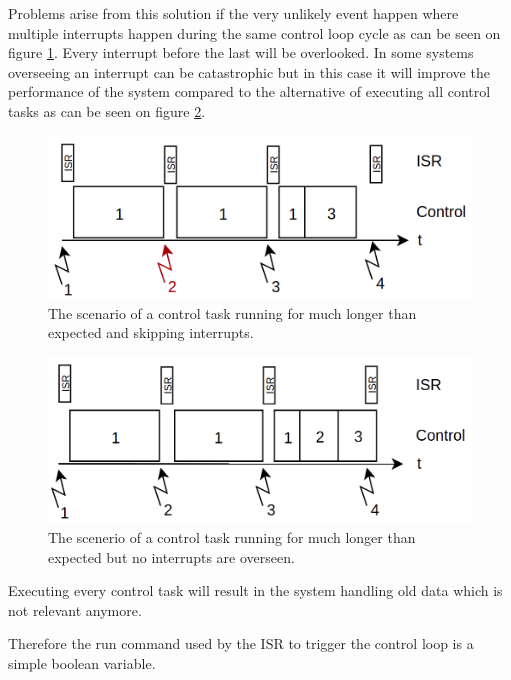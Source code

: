 Problems arise from this solution if the very unlikely event happen where multiple interrupts happen during the same control loop cycle as can be seen on figure \ref{fig:isr4}. Every interrupt before the last will be overlooked. In some systems overseeing an interrupt can be catastrophic but in this case it will improve the performance of the system compared to the alternative of executing all control tasks as can be seen on figure \ref{fig:isr3}.

\begin{figure}[H]
	\centering
	\includegraphics[width=0.65\linewidth]{pictures/software/isr/isr4.png}
	\caption{The scenario of a control task running for much longer than expected and skipping interrupts.}
	\label{fig:isr4}
\end{figure}

\begin{figure}[H]
	\centering
	\includegraphics[width=0.65\linewidth]{pictures/software/isr/isr3.png}
	\caption{The scenerio of a control task running for much longer than expected but no interrupts are overseen.}
	\label{fig:isr3}
\end{figure}


Executing every control task will result in the system handling old data which is not relevant anymore. 

Therefore the run command used by the ISR to trigger the control loop is a simple boolean variable.